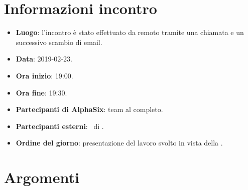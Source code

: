 \newcommand{\documento}{\VE}
\newcommand{\nomedocumentofisico}{VE\_2019-02-23.pdf}
\newcommand{\redazione}{\TG}
\newcommand{\verifica}{\SG}
\newcommand{\approvazione}{\CV}
\newcommand{\versione}{1.0.0}
\newcommand{\uso}{Esterno}
\newcommand{\destinateTo}{\TV, \\ & \RC, \\ & \II}
\newcommand{\datacreazione}{23 febbraio 2019}
\newcommand{\datamodifica}{25 febbraio 2019}
\newcommand{\stato}{Approvato}

\def\TABELLE{false}	%
\def\FIGURE{false} 	%






    

    
    
    \section{Informazioni incontro}
    	\begin{itemize}
    		\item \textbf{Luogo}: l'incontro è stato effettuato da remoto tramite una chiamata  e un successivo scambio di email.
    		\item \textbf{Data}: 2019-02-23.
    		\item \textbf{Ora inizio}: 19:00.
    		\item \textbf{Ora fine}: 19:30.
    		\item \textbf{Partecipanti di AlphaSix}: team al completo.
    		\item \textbf{Partecipanti esterni}: \DZ~di \II.
    		\item \textbf{Ordine del giorno}: presentazione del lavoro svolto in vista della .
    		
    	\end{itemize}
    
    \section{Argomenti}
    
